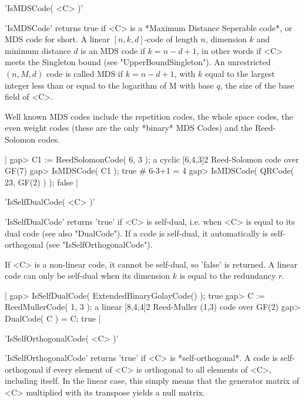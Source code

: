 
'IsMDSCode( <C> )'

'IsMDSCode' returns  true if <C>  is a *Maximum Distance Seperable code*,
or MDS code for short. A linear $[n, k, d]$-code of length $n$, dimension
$k$ and minimum distance $d$ is an MDS code  if $k=n-d+1$, in other words
if <C> meets  the   Singleton  bound (see  "UpperBoundSingleton").     An
unrestricted $(n, M, d)$ code is called MDS if  $k=n-d+1$, with $k$ equal
to the largest integer less than or equal to the logarithm of M with base
$q$, the size of the base field of <C>.

Well known MDS codes include the repetition codes, the whole space codes,
the even weight codes (these are the only *binary* MDS Codes) and the
Reed-Solomon codes.

|    gap> C1 := ReedSolomonCode( 6, 3 );
    a cyclic [6,4,3]2 Reed-Solomon code over GF(7)
    gap> IsMDSCode( C1 );
    true    # 6-3+1 = 4
    gap> IsMDSCode( QRCode( 23, GF(2) ) );
    false |


'IsSelfDualCode( <C> )'

'IsSelfDualCode'  returns 'true' if <C>  is  self-dual, i.e.  when <C> is
equal to its dual code (see also "DualCode"). If  a code is self-dual, it
automatically is self-orthogonal (see "IsSelfOrthogonalCode").

If  <C> is a   non-linear code,  it cannot be   self-dual, so  'false' is
returned.  A linear code can only be self-dual  when its dimension $k$ is
equal to the redundancy $r$.

|    gap> IsSelfDualCode( ExtendedBinaryGolayCode() );
    true
    gap> C := ReedMullerCode( 1, 3 );
    a linear [8,4,4]2 Reed-Muller (1,3) code over GF(2)
    gap> DualCode( C ) = C;
    true |


'IsSelfOrthogonalCode( <C> )'

'IsSelfOrthogonalCode'   returns 'true' if   <C> is *self-orthogonal*.  A
code  is self-orthogonal  if  every element of  <C>  is orthogonal to all
elements of <C>, including itself. In  the linear case, this simply means
that the  generator matrix of <C>  multiplied with its transpose yields a
null matrix.

